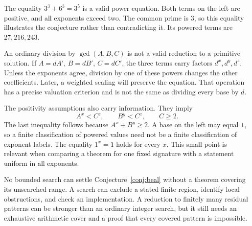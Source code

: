 \begin{example}\label{ex:commonprime}
The equality $3^3+6^3=3^5$ is a valid power equation. Both terms on the left are positive, and all exponents exceed two. The common prime is $3$, so this equality illustrates the conjecture rather than contradicting it. Its powered terms are $27,216,243$.
\end{example}
An ordinary division by $\gcd(A,B,C)$ is not a valid reduction to a primitive solution. If $A=dA'$, $B=dB'$, $C=dC'$, the three terms carry factors $d^x,d^y,d^z$. Unless the exponents agree, division by one of these powers changes the other coefficients. Later, a weighted scaling will preserve the equation. That operation has a precise valuation criterion and is not the same as dividing every base by $d$.

The positivity assumptions also carry information. They imply
\begin{equation}\label{eq:heightbasic}
A^x<C^z,\qquad B^y<C^z,\qquad C\ge2.
\end{equation}
The last inequality follows because $A^x+B^y\ge2$. A base on the left may equal $1$, so a finite classification of powered values need not be a finite classification of exponent labels. The equality $1^x=1$ holds for every $x$. This small point is relevant when comparing a theorem for one fixed signature with a statement uniform in all exponents.

No bounded search can settle Conjecture~\ref{conj:beal} without a theorem covering its unsearched range. A search can exclude a stated finite region, identify local obstructions, and check an implementation. A reduction to finitely many residual patterns can be stronger than an ordinary integer search, but it still needs an exhaustive arithmetic cover and a proof that every covered pattern is impossible.
